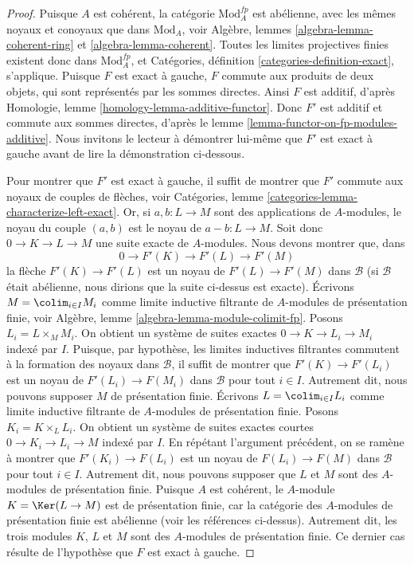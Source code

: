\begin{proof}
Puisque $A$ est cohérent, la catégorie $\text{Mod}^{fp}_A$ est abélienne,
avec les mêmes noyaux et conoyaux que dans $\text{Mod}_A$, voir
Algèbre, lemmes \ref{algebra-lemma-coherent-ring} et
\ref{algebra-lemma-coherent}. Toutes les limites projectives finies existent donc dans
$\text{Mod}^{fp}_A$, et
Catégories, définition \ref{categories-definition-exact}, s'applique.
Puisque $F$ est exact à gauche, $F$ commute aux produits de deux objets, qui sont
représentés par les sommes directes. Ainsi $F$ est additif, d'après
Homologie, lemme \ref{homology-lemma-additive-functor}.
Donc $F'$ est additif et commute aux sommes directes, d'après le
lemme \ref{lemma-functor-on-fp-modules-additive}.
Nous invitons le lecteur à démontrer lui-même que $F'$ est exact à gauche
avant de lire la démonstration ci-dessous.

\medskip\noindent
Pour montrer que $F'$ est exact à gauche, il suffit de montrer que $F'$ commute
aux noyaux de couples de flèches, voir
Catégories, lemme \ref{categories-lemma-characterize-left-exact}.
Or, si $a, b : L \to M$ sont des applications de $A$-modules, le
noyau du couple $(a,b)$ est le noyau de $a - b : L \to M$.
Soit donc $0 \to K \to L \to M$ une suite exacte
de $A$-modules. Nous devons montrer que, dans
$$
0 \to F'(K) \to F'(L) \to F'(M)
$$
la flèche $F'(K) \to F'(L)$ est un noyau de $F'(L) \to F'(M)$ dans $\mathcal{B}$
(si $\mathcal{B}$ était abélienne, nous dirions que la suite ci-dessus
est exacte).
Écrivons $M = \colim_{i \in I} M_i$ comme limite inductive filtrante de
$A$-modules de présentation finie, voir
Algèbre, lemme \ref{algebra-lemma-module-colimit-fp}.
Posons $L_i = L \times_M M_i$. 
On obtient un système de suites exactes $0 \to K \to L_i \to M_i$
indexé par $I$. Puisque, par hypothèse, les limites inductives filtrantes commutent à la formation des noyaux
dans $\mathcal{B}$, 
il suffit de montrer que $F'(K) \to F'(L_i)$ est un noyau de
$F'(L_i) \to F(M_i)$ dans $\mathcal{B}$ pour tout $i \in I$. Autrement dit, nous pouvons
supposer $M$ de présentation finie. Écrivons $L = \colim_{i \in I} L_i$
comme limite inductive filtrante de $A$-modules de présentation finie.
Posons $K_i = K \times_L L_i$. On obtient un système de suites exactes courtes
$0 \to K_i \to L_i \to M$ indexé par $I$.
En répétant l'argument précédent, on se ramène à montrer que
$F'(K_i) \to F(L_i)$ est un noyau de
$F(L_i) \to F(M)$ dans $\mathcal{B}$ pour tout $i \in I$.
Autrement dit, nous pouvons supposer que
$L$ et $M$ sont des $A$-modules de présentation finie.
Puisque $A$ est cohérent, le $A$-module $K = \Ker(L \to M)$ est
de présentation finie, car la catégorie des
$A$-modules de présentation finie est abélienne (voir les références ci-dessus).
Autrement dit, les trois modules $K$, $L$ et $M$
sont des $A$-modules de présentation finie. Ce dernier cas résulte
de l'hypothèse que $F$ est exact à gauche.
\end{proof}

